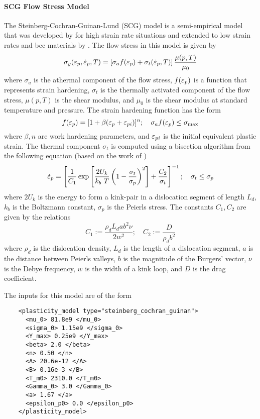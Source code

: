   \paragraph{SCG Flow Stress Model}
  The Steinberg-Cochran-Guinan-Lund (SCG) model is a semi-empirical model
  that was developed by \cite{Steinberg1980} for high strain rate 
  situations and extended to low strain rates and bcc materials by
  \cite{Steinberg1989}.  The flow stress in this model is given by
  \begin{equation}\label{eq:SCGL}
    \sigma_y(\varepsilon_p,\dot{\varepsilon}_{p},T) = 
     \left[\sigma_a f(\varepsilon_p) + \sigma_t (\dot{\varepsilon}_{p}, T)\right]
     \frac{\mu(p,T)}{\mu_0} 
  \end{equation}
  where $\sigma_a$ is the athermal component of the flow stress,
  $f(\varepsilon_p)$ is a function that represents strain hardening,
  $\sigma_t$ is the thermally activated component of the flow stress,
  $\mu(p,T)$ is the shear modulus, and $\mu_0$ is the shear modulus 
  at standard temperature and pressure.  The strain hardening function
  has the form
  \begin{equation}
    f(\varepsilon_p) = [1 + \beta(\varepsilon_p + \varepsilon_{pi})]^n ; \quad
    \sigma_a f(\varepsilon_p) \le \sigma_{\text{max}}
  \end{equation}
  where $\beta, n$ are work hardening parameters, and $\varepsilon_{pi}$ is the 
  initial equivalent plastic strain.  The thermal component $\sigma_t$
  is computed using a bisection algorithm from the following equation (based 
  on the work of \cite{Hoge1977})
  \begin{equation}
    \dot{\varepsilon}_{p} = \left[\frac{1}{C_1}\exp\left[\frac{2U_k}{k_b~T}
      \left(1 - \frac{\sigma_t}{\sigma_p}\right)^2\right] + 
      \frac{C_2}{\sigma_t}\right]^{-1}; \quad
    \sigma_t \le \sigma_p
  \end{equation}
  where $2 U_k$ is the energy to form a kink-pair in a dislocation segment
  of length $L_d$, $k_b$ is the Boltzmann constant, $\sigma_p$ is the Peierls
  stress. The constants $C_1, C_2$ are given by the relations
  \begin{equation}
    C_1 := \frac{\rho_d L_d a b^2 \nu}{2 w^2}; \quad
    C_2 := \frac{D}{\rho_d b^2}
  \end{equation}
  where $\rho_d$ is the dislocation density, $L_d$ is the length of a 
  dislocation segment, $a$ is the distance between Peierls valleys, 
  $b$ is the magnitude of the Burgers' vector, $\nu$ is the Debye frequency,
  $w$ is the width of a kink loop, and $D$ is the drag coefficient.

  The inputs for this model are of the form
  \lstset{language=XML}
  \begin{lstlisting}
    <plasticity_model type="steinberg_cochran_guinan">
      <mu_0> 81.8e9 </mu_0>
      <sigma_0> 1.15e9 </sigma_0>
      <Y_max> 0.25e9 </Y_max>
      <beta> 2.0 </beta>
      <n> 0.50 </n>
      <A> 20.6e-12 </A>
      <B> 0.16e-3 </B>
      <T_m0> 2310.0 </T_m0>
      <Gamma_0> 3.0 </Gamma_0>
      <a> 1.67 </a>
      <epsilon_p0> 0.0 </epsilon_p0>
    </plasticity_model>
  \end{lstlisting}

